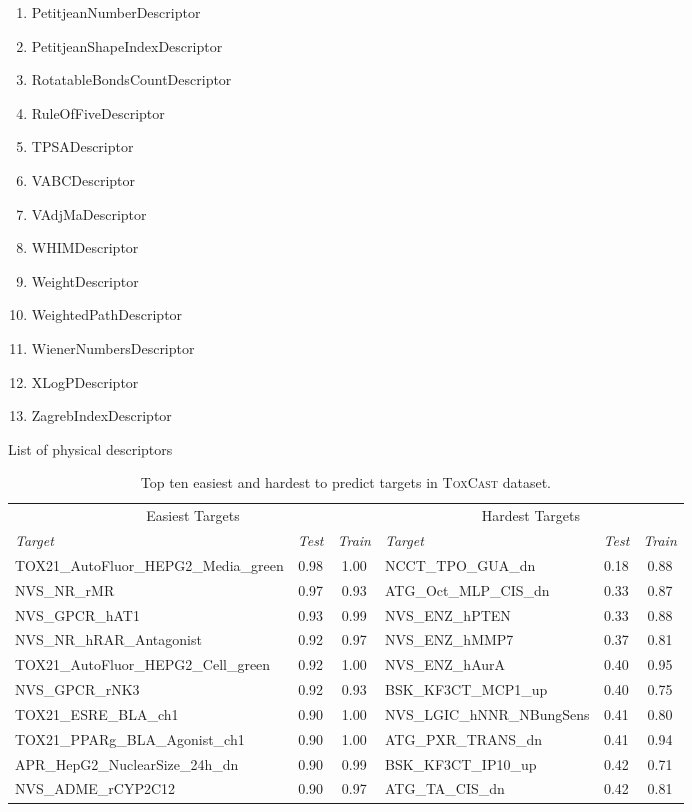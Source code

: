 \documentclass[11pt,a4paper]{article}
\begin{document}
\begin{table}[ht]
\begin{multicols}{2}
\begin{enumerate}
\item   PetitjeanNumberDescriptor
\item   PetitjeanShapeIndexDescriptor
\item   RotatableBondsCountDescriptor
\item   RuleOfFiveDescriptor
\item   TPSADescriptor
\item   VABCDescriptor
\item   VAdjMaDescriptor
\item   WHIMDescriptor
\item   WeightDescriptor
\item   WeightedPathDescriptor
\item   WienerNumbersDescriptor
\item   XLogPDescriptor
\item   ZagrebIndexDescriptor
\end{enumerate}
\end{multicols}
\caption{List of physical descriptors}
\label{sec_list_physical_descriptors}
\end{table}
\clearpage

\begin{table}[ht]\small
\centering
\begin{tabular}{lcclcc}
  \toprule
  \multicolumn{3}{c}{Easiest Targets} & \multicolumn{3}{c}{Hardest Targets} \\
  \cmidrule(lr){1-3}
  \cmidrule(lr){4-6}
{\it Target} & {\it Test} & {\it Train} & {\it Target} & {\it Test} & {\it Train} \\ 
  \midrule
  TOX21\_AutoFluor\_HEPG2\_Media\_green & 0.98 & 1.00 & NCCT\_TPO\_GUA\_dn & 0.18 & 0.88 \\ 
  NVS\_NR\_rMR & 0.97 & 0.93                          & ATG\_Oct\_MLP\_CIS\_dn & 0.33 & 0.87 \\ 
  NVS\_GPCR\_hAT1 & 0.93 & 0.99                       & NVS\_ENZ\_hPTEN & 0.33 & 0.88 \\ 
  NVS\_NR\_hRAR\_Antagonist & 0.92 & 0.97             & NVS\_ENZ\_hMMP7 & 0.37 & 0.81 \\ 
  TOX21\_AutoFluor\_HEPG2\_Cell\_green & 0.92 & 1.00  & NVS\_ENZ\_hAurA & 0.40 & 0.95 \\ 
  NVS\_GPCR\_rNK3 & 0.92 & 0.93                       & BSK\_KF3CT\_MCP1\_up & 0.40 & 0.75 \\ 
  TOX21\_ESRE\_BLA\_ch1 & 0.90 & 1.00                 & NVS\_LGIC\_hNNR\_NBungSens & 0.41 & 0.80 \\ 
  TOX21\_PPARg\_BLA\_Agonist\_ch1 & 0.90 & 1.00       & ATG\_PXR\_TRANS\_dn & 0.41 & 0.94 \\ 
  APR\_HepG2\_NuclearSize\_24h\_dn & 0.90 & 0.99      & BSK\_KF3CT\_IP10\_up & 0.42 & 0.71 \\ 
  NVS\_ADME\_rCYP2C12 & 0.90 & 0.97                   & ATG\_TA\_CIS\_dn & 0.42 & 0.81 \\ 
  \bottomrule
\end{tabular}
\caption{
Top ten easiest and hardest to predict targets in \textsc{ToxCast} dataset.} 
\label{tab_pertarget_auc}
\end{table}



\end{document}
